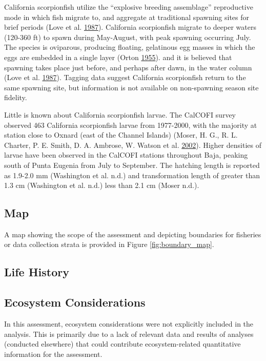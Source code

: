\documentclass[12pt,]{article}
\begin{document}
California scorpionfish utilize the ``explosive breeding assemblage''
reproductive mode in which fish migrate to, and aggregate at traditional
spawning sites for brief periods (Love et al.
\protect\hyperlink{ref-Love1987}{1987}). California scorpionfish migrate
to deeper waters (120-360 ft) to spawn during May-August, with peak
spawning occurring July. The species is oviparous, producing floating,
gelatinous egg masses in which the eggs are embedded in a single layer
(Orton \protect\hyperlink{ref-Orton1955}{1955}). and it is believed that
spawning takes place just before, and perhaps after dawn, in the water
column (Love et al. \protect\hyperlink{ref-Love1987}{1987}). Tagging
data suggest California scorpionfish return to the same spawning site,
but information is not available on non-spawning season site fidelity.

Little is known about California scorpionfish larvae. The CalCOFI survey
observed 463 California scorpionfish larvae from 1977-2000, with the
majority at station close to Oxnard (east of the Channel Islands)
(Moser, H. G., R. L. Charter, P. E. Smith, D. A. Ambrose, W. Watson et
al. \protect\hyperlink{ref-Moser2002}{2002}). Higher densities of larvae
have been observed in the CalCOFI stations throughout Baja, peaking
south of Punta Eugenia from July to September. The hatching length is
reported as 1.9-2.0 mm (Washington et al. n.d.) and transformation
length of greater than 1.3 cm (Washington et al. n.d.) less than 2.1 cm
(Moser n.d.).

\subsection{Map}\label{map}

A map showing the scope of the assessment and depicting boundaries for
fisheries or data collection strata is provided in Figure
\ref{fig:boundary_map}.

\subsection{Life History}\label{life-history}

\subsection{Ecosystem Considerations}\label{ecosystem-considerations-1}

In this assessment, ecosystem considerations were not explicitly
included in the analysis. This is primarily due to a lack of relevant
data and results of analyses (conducted elsewhere) that could contribute
ecosystem-related quantitative information for the assessment.
\end{document}
